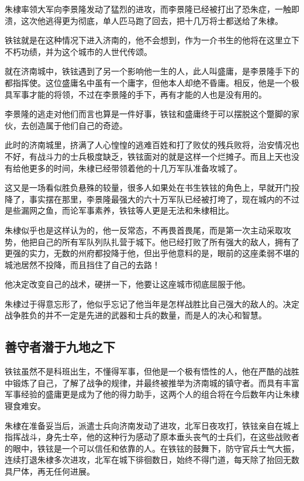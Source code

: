 \begin{multicols}{\theparacolNo}
		朱棣率领大军向李景隆发动了猛烈的进攻，而李景隆已经被打出了恐朱症，一触即溃，这次他逃得更为彻底，单人匹马跑了回去，把十几万将士都送给了朱棣。

		铁铉就是在这种情况下进入济南的，他不会想到，作为一介书生的他将在这里立下不朽功绩，并为这个城市的人世代传颂。

		就在济南城中，铁铉遇到了另一个影响他一生的人，此人叫盛庸，是李景隆手下的都指挥使。这位盛庸名中虽有一个庸字，但他本人却绝不昏庸。相反，他是一个极具军事才能的将领，不过在李景隆的手下，再有才能的人也是没有用的。

		李景隆的逃走对他们而言也算是一件好事，铁铉和盛庸终于可以摆脱这个蹩脚的家伙，去创造属于他们自己的奇迹。

		此时的济南城里，挤满了人心惶惶的逃难百姓和打了败仗的残兵败将，治安情况也不好，有战斗力的士兵极度缺乏，铁铉面对的就是这样一个烂摊子。而且上天也没有给他更多的时间，朱棣已经带领着他的十几万军队准备攻城了。

		这又是一场看似胜负悬殊的较量，很多人如果处在书生铁铉的角色上，早就开门投降了，事实摆在那里，李景隆最强大的六十万军队已经被打垮了，现在城内的不过是些漏网之鱼，而论军事素养，铁铉等人更是无法和朱棣相比。

		朱棣似乎也是这样认为的，他一反常态，不再畏首畏尾，而是第一次主动采取攻势，他把自己的所有军队列队扎营于城下。他已经打败了所有强大的敌人，拥有了更强的实力，无数的州府都投降于他，但出乎他意料的是，眼前的这座柔弱不堪的城池居然不投降，而且挡住了自己的去路！

		他决定改变自己的战术，硬拼一下，他要让这座城市彻底屈服于他。

		朱棣过于得意忘形了，他似乎忘记了他当年是怎样战胜比自己强大的敌人的。决定战争胜负的并不一定是先进的武器和士兵的数量，而是人的决心和智慧。

		\subsection{善守者潜于九地之下}
		铁铉虽然不是科班出生，不懂得军事，但他是一个极有悟性的人，他在严酷的战胜中锻炼了自己，了解了战争的规律，并最终被推举为济南城的镇守者。而具有丰富军事经验的盛庸更是成为了他的得力助手，这两个人的组合将在今后数年内让朱棣寝食难安。

		朱棣在准备妥当后，派遣士兵向济南发动了进攻，北军日夜攻打，铁铉亲自在城上指挥战斗，身先士卒，他的这种行为感动了原本垂头丧气的士兵们，在这些战败者的眼中，铁铉是一个可以信任和依靠的人。在铁铉的鼓舞下，防守官兵士气大振，连续打退朱棣多次进攻，北军在城下徘徊数日，始终不得门道，每天除了抬回无数具尸体，再无任何进展。


\end{multicols}
